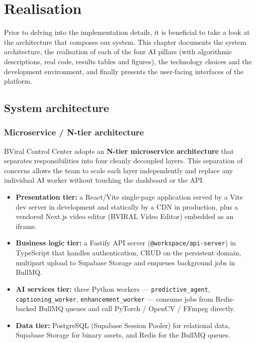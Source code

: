 \chapter{Realisation}

\chapintro
Prior to delving into the implementation details, it is beneficial to take a look at the
architecture that composes our system. This chapter documents the system architecture, the
realisation of each of the four AI pillars (with algorithmic descriptions, real code, results
tables and figures), the technology choices and the development environment, and finally
presents the user-facing interfaces of the platform.

\section{System architecture}
\label{sec:sysarch}

\subsection{Microservice / N-tier architecture}
\label{sec:ntier}

BViral Control Center adopts an \textbf{N-tier microservice architecture} that separates
responsibilities into four cleanly decoupled layers. This separation of concerns allows the
team to scale each layer independently and replace any individual AI worker without touching
the dashboard or the API.

\begin{itemize}
  \item \textbf{Presentation tier:} a React/Vite single-page application served by a Vite
        dev server in development and statically by a CDN in production, plus a vendored
        Next.js video editor (BVIRAL Video Editor) embedded as an iframe.
  \item \textbf{Business logic tier:} a Fastify API server (\texttt{@workspace/api-server})
        in TypeScript that handles authentication, CRUD on the persistent domain, multipart
        upload to Supabase Storage and enqueues background jobs in BullMQ.
  \item \textbf{AI services tier:} three Python workers --- \texttt{predictive\_agent},
        \texttt{captioning\_worker}, \texttt{enhancement\_worker} --- consume jobs from
        Redis-backed BullMQ queues and call PyTorch / OpenCV / FFmpeg directly.
  \item \textbf{Data tier:} PostgreSQL (Supabase Session Pooler) for relational data,
        Supabase Storage for binary assets, and Redis for the BullMQ queues.
\end{itemize}

